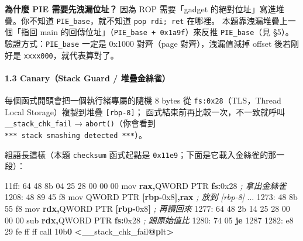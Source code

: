 \documentclass[10pt,a4paper]{article}
\newenvironment{Shaded}{\begin{snugshade}}{\end{snugshade}}
\newcommand{\BaseNTok}[1]{\textcolor[rgb]{0.00,0.00,0.81}{#1}}
\newcommand{\BuiltInTok}[1]{#1}
\newcommand{\CommentTok}[1]{\textcolor[rgb]{0.56,0.35,0.01}{\textit{#1}}}
\newcommand{\ControlFlowTok}[1]{\textcolor[rgb]{0.13,0.29,0.53}{\textbf{#1}}}
\newcommand{\DataTypeTok}[1]{\textcolor[rgb]{0.13,0.29,0.53}{#1}}
\newcommand{\DecValTok}[1]{\textcolor[rgb]{0.00,0.00,0.81}{#1}}
\newcommand{\ErrorTok}[1]{\textcolor[rgb]{0.64,0.00,0.00}{\textbf{#1}}}
\newcommand{\FunctionTok}[1]{\textcolor[rgb]{0.13,0.29,0.53}{\textbf{#1}}}
\newcommand{\KeywordTok}[1]{\textcolor[rgb]{0.13,0.29,0.53}{\textbf{#1}}}
\newcommand{\NormalTok}[1]{#1}
\newcommand{\OperatorTok}[1]{\textcolor[rgb]{0.81,0.36,0.00}{\textbf{#1}}}
\renewenvironment{Shaded}{%
  \def\FrameCommand{\fboxsep=3.2pt\colorbox{shadecolor}}%
  \MakeFramed{\advance\hsize-\width\FrameRestore\small}%
}{%
  \endMakeFramed
}
\renewenvironment{quote}{%
  \begin{mdframed}[linewidth=0pt,innerleftmargin=0pt,innerrightmargin=0pt,
    innerbottommargin=0pt,innertopmargin=0pt,skipabove=0.55em,skipbelow=0.55em,
    leftmargin=0.9em,rightmargin=0.4em,startcode={\color{quotebar}\vrule width 2.6pt},%
    endcode={}]%
  \itshape\color{black}%
}{%
  \end{mdframed}%
}
\begin{document}
\begin{quote}
\textbf{為什麼 PIE 需要先洩漏位址？} 因為 ROP 需要「gadget
的絕對位址」寫進堆疊。你不知道 \texttt{PIE\_\allowbreak{}base}，就不知道
\texttt{pop\ \allowbreak{}rdi;\ \allowbreak{}ret} 在哪裡。 本題靠洩漏堆疊上一個「指回 main
的回傳位址」（\texttt{PIE\_\allowbreak{}base\ \allowbreak{}+\ \allowbreak{}0x1a9f}）來反推
\texttt{PIE\_\allowbreak{}base}（見 §5）。 驗證方式：\texttt{PIE\_\allowbreak{}base} 一定是 0x1000
對齊（page 對齊），洩漏值減掉 offset 後若剛好是
\texttt{xxxx000}，就代表算對了。
\end{quote}

\paragraph{1.3 Canary（Stack Guard /
堆疊金絲雀）}\label{canarystack-guard-ux5806ux758aux91d1ux7d72ux96c0}

每個函式開頭會把一個執行緒專屬的隨機 8 bytes 從
\texttt{fs:\allowbreak{}0x28}（TLS，Thread Local Storage）複製到堆疊
\texttt{{[}rbp-\allowbreak{}8{]}}； 函式結束前再比較一次，不一致就呼叫
\texttt{\_\allowbreak{}\_\allowbreak{}stack\_\allowbreak{}chk\_\allowbreak{}fail} → \texttt{abort()}（你會看到
\texttt{***\ \allowbreak{}stack\ \allowbreak{}smashing\ \allowbreak{}detected\ \allowbreak{}***}）。

組語長這樣（本題 \texttt{checksum} 函式起點是
\texttt{0x11e9}；下面是它載入金絲雀的那一段）：

\begin{Shaded}
\begin{Highlighting}[]
\NormalTok{11ff: 64 48 8b 04 25 28 00 00 00   }\BuiltInTok{mov} \KeywordTok{rax}\OperatorTok{,}\DataTypeTok{QWORD} \DataTypeTok{PTR} \KeywordTok{fs}\OperatorTok{:}\BaseNTok{0x28}   \CommentTok{; 拿出金絲雀}
\NormalTok{1208: 48 89 45 f8                  mov }\DataTypeTok{QWORD} \DataTypeTok{PTR} \OperatorTok{[}\KeywordTok{rbp}\OperatorTok{{-}}\BaseNTok{0x8}\OperatorTok{],}\KeywordTok{rax} \CommentTok{; 放到 [rbp{-}8]}
\NormalTok{...}
\NormalTok{1273: 48 8b 55 f8                  mov }\KeywordTok{rdx}\OperatorTok{,}\DataTypeTok{QWORD} \DataTypeTok{PTR} \OperatorTok{[}\KeywordTok{rbp}\OperatorTok{{-}}\BaseNTok{0x8}\OperatorTok{]} \CommentTok{; 再讀回來}
\NormalTok{1277: 64 48 2b 14 25 28 00 00 00   }\BuiltInTok{sub} \KeywordTok{rdx}\OperatorTok{,}\DataTypeTok{QWORD} \DataTypeTok{PTR} \KeywordTok{fs}\OperatorTok{:}\BaseNTok{0x28}   \CommentTok{; 跟原始值比}
\NormalTok{1280: 74 05                        }\ControlFlowTok{je}  \DecValTok{1287}
\NormalTok{1282: e8 }\DecValTok{29}\NormalTok{ fe ff ff               call }\BaseNTok{10b}\ErrorTok{0} \OperatorTok{\textless{}}\NormalTok{\_\_stack\_chk\_fail}\FunctionTok{@}\ErrorTok{p}\NormalTok{lt}\OperatorTok{\textgreater{}}
\end{Highlighting}
\end{Shaded}
\end{document}
